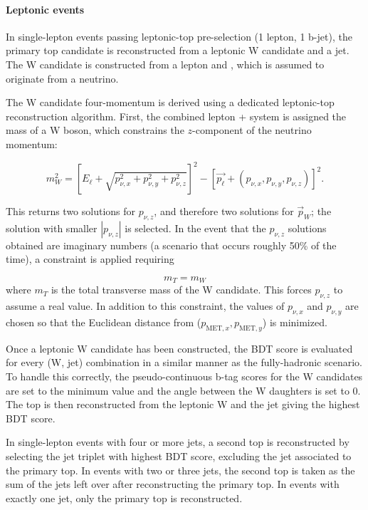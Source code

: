 \paragraph{Leptonic events}
In single-lepton events passing leptonic-top pre-selection (1 lepton, 1 b-jet), the primary top candidate is reconstructed from a leptonic W candidate and a jet. The W candidate is constructed from a lepton and \MET, which is assumed to originate from a neutrino.


The W candidate four-momentum is derived using a dedicated leptonic-top reconstruction algorithm. First, the combined lepton + \MET system is assigned the mass of a W boson, which constrains the $z$-component of the neutrino momentum:

\begin{equation}
m_W^2 = \left[E_\ell + \sqrt{p_{\nu,x}^2 + p_{\nu,y}^2 + p_{\nu,z}^2}\right]^2 - \left[\vec{p_\ell} + (p_{\nu,x},p_{\nu,y},p_{\nu,z})\right]^2.
\end{equation}

This returns two solutions for $p_{\nu,z}$, and therefore two solutions for $\vec{p}_{W}$; the solution with smaller $|p_{\nu,z}|$ is selected. In the event that the $p_{\nu,z}$ solutions obtained are imaginary numbers (a scenario that occurs roughly 50\% of the time), a constraint is applied requiring

\begin{equation}
m_{T} = m_{W}
\end{equation}
where $m_{T}$ is the total transverse mass of the W candidate. This forces $p_{\nu,z}$ to assume a real value. In addition to this constraint, the values of $p_{\nu,x}$ and  $p_{\nu,y}$ are chosen so that the Euclidean distance from ($p_{\text{MET},x},p_{\text{MET},y}$) is minimized.

Once a leptonic W candidate has been constructed, the BDT score is evaluated for every (W, jet) combination in a similar manner as the fully-hadronic scenario. To handle this correctly, the pseudo-continuous b-tag scores for the W candidates are set to the minimum value and the angle between the W daughters is set to 0. The top is then reconstructed from the leptonic W and the jet giving the highest BDT score.

In single-lepton events with four or more jets, a second top is reconstructed by selecting the jet triplet with highest BDT score, excluding the jet associated to the primary top. In events with two or three jets, the second top is taken as the sum of the jets left over after reconstructing the primary top. In events with exactly one jet, only the primary top is reconstructed.

